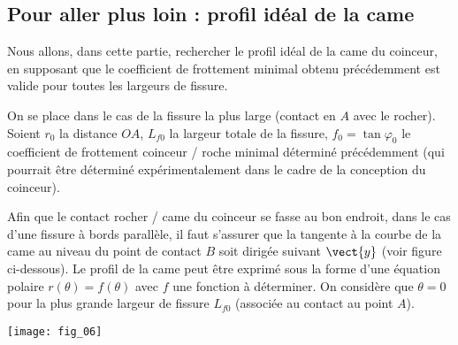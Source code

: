 \subsection*{Pour aller plus loin : profil idéal de la came}

Nous allons, dans cette partie, rechercher le profil idéal de la came du coinceur, en supposant
que le coefficient de frottement minimal obtenu précédemment est valide pour toutes les largeurs
de fissure.

On se place dans le cas de la fissure la plus large (contact en $A$ avec le rocher). Soient $r_0$ la
distance $OA$, $L_{f0}$ la largeur totale de la fissure, $f_0 = \tan \varphi_0$ le coefficient de frottement coinceur / roche minimal déterminé précédemment (qui pourrait être déterminé expérimentalement dans
le cadre de la conception du coinceur).


Afin que le contact rocher / came du coinceur se fasse au bon endroit, dans le cas d’une fissure
à bords parallèle, il faut s’assurer que la tangente à la courbe de la came au niveau du point de
contact $B$ soit dirigée suivant $\vect{y}$ (voir figure ci-dessous). Le profil de la came peut être exprimé
sous la forme d’une équation polaire $r(\theta) = f(\theta)$ avec $f$ une fonction à déterminer. On considère
que $\theta=0$ pour la plus grande largeur de fissure $L_{f0}$ (associée au contact au point $A$).

\begin{center}
\texttt{[image: fig\_06]}
\end{center}



